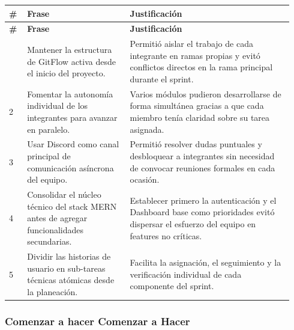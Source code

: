 \documentclass[11pt,a4paper]{article}
\begin{document}
\begingroup
\scriptsize
\setlength{\tabcolsep}{3pt}
\begin{longtable}{P{0.06\linewidth}P{0.34\linewidth}P{0.54\linewidth}}
\toprule
\textbf{\#} & \textbf{Frase} & \textbf{Justificación} \\
\midrule
\endfirsthead
\toprule
\textbf{\#} & \textbf{Frase} & \textbf{Justificación} \\
\midrule
\endhead
\bottomrule
{} & Mantener la estructura de GitFlow activa desde el inicio del proyecto. & Permitió aislar el trabajo de cada integrante en ramas propias y evitó conflictos directos en la rama principal durante el sprint. \\
2 & Fomentar la autonomía individual de los integrantes para avanzar en paralelo. & Varios módulos pudieron desarrollarse de forma simultánea gracias a que cada miembro tenía claridad sobre su tarea asignada. \\
3 & Usar Discord como canal principal de comunicación asíncrona del equipo. & Permitió resolver dudas puntuales y desbloquear a integrantes sin necesidad de convocar reuniones formales en cada ocasión. \\
4 & Consolidar el núcleo técnico del stack MERN antes de agregar funcionalidades secundarias. & Establecer primero la autenticación y el Dashboard base como prioridades evitó dispersar el esfuerzo del equipo en features no críticas. \\
5 & Dividir las historias de usuario en sub-tareas técnicas atómicas desde la planeación. & Facilita la asignación, el seguimiento y la verificación individual de cada componente del sprint. \\
\end{longtable}
\endgroup

\subsubsection{Comenzar a hacer Comenzar a Hacer}
\end{document}
